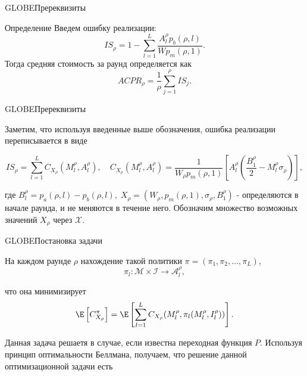 \documentclass[aspectratio=169]{beamer}
\begin{document}
        \begin{frame}{GLOBE}{Пререквизиты}
            \begin{block}{Определение}
            Введем ошибку реализации:
                \begin{equation*}
                    IS_\rho = 1 - \sum\limits_{l = 1}^{L} \frac{A_l^\rho p_b(\rho, l)}{Wp_m(\rho , 1)}.
                \end{equation*}
                Тогда средняя стоимость за раунд определяется как
                \begin{equation*}
                    ACPR_\rho = \frac{1}{\rho} \sum\limits_{j=1}^\rho IS_j.
                \end{equation*}
            \end{block}

        \end{frame}

        \begin{frame}{GLOBE}{Пререквизиты}

            Заметим, что используя введенные выше обозначения, ошибка реализации переписывается в виде
            
            \begin{equation*}
                IS_\rho = \sum\limits_{l=1}^L C_{X_\rho}(M_l^\rho, A_l^\rho), \quad C_{X_\rho}(M_l^\rho, A_l^\rho) = \frac{1}{W_\rho p_m(\rho, 1)} \left[ A_l^\rho \left(\frac{B_1^\rho}{2} - M_l^\rho \sigma_\rho \right) \right],
            \end{equation*}
            
            где $B_l^\rho = p_a(\rho, l) - p_b(\rho, l), \; X_\rho = (W_\rho, p_m(\rho, 1), \sigma_\rho, B_1^\rho )$ - определяются в начале раунда, и не меняются в течение него. Обозначим множество возможных значений $X_\rho$ через $\mathcal X$.
        
        \end{frame}

        \begin{frame}{GLOBE}{Постановка задачи}
        
            На каждом раунде $\rho$ нахождение такой политики $\pi = (\pi_1, \pi_2, \ldots, \pi_L)$,
            \begin{equation*}
                \pi_l \colon \mathcal M \times \mathcal I \to \mathcal A_l^\rho ,
            \end{equation*}

            что она минимизирует
            \begin{equation*}
                \E \left[ C_{X_\rho}^\pi \right] = \E \left[ \sum\limits_{l=1}^L C_{X_\rho}(M_l^\rho, \pi_l (M_l^\rho, I_l^\rho) ) \right].
            \end{equation*}

            Данная задача решаетя в случае, если известна переходная функция $P$. Используя принцип оптимальности Беллмана, получаем, что решение данной оптимизационной задачи есть
            
            
        \end{frame}
        
\end{document}
